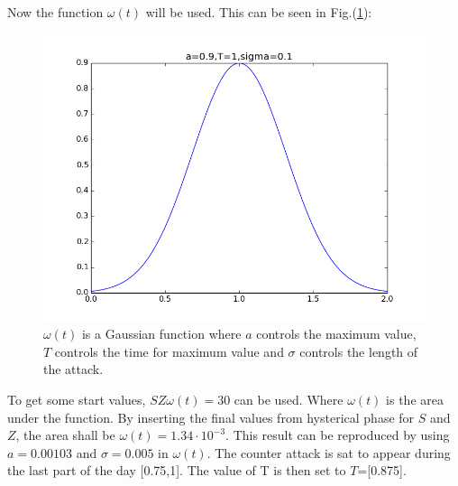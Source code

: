 \documentclass[%
twoside,                 %
final,                   %
chapterprefix=true,      %
open=right               %
10pt]{book}
\begin{document}
\vspace{3mm}




\vspace{3mm}


Now the function $\omega(t)$ will be used. This can be seen in Fig.(\ref{fig:omega_function}):


\begin{figure}[ht]
  \centerline{\includegraphics[width=0.9\linewidth]{1_fig/omega_function.png}}
  \caption{
  \label{fig:omega_function} $\omega (t)$ is a Gaussian function where $a$ controls the maximum value, $T$ controls the time for maximum value and $\sigma$ controls the length of the attack.
  }
\end{figure}


To get some start values, $SZ\omega(t)=30$ can be used. Where $\omega(t)$ is the area under the function. By inserting the final values from hysterical phase for $S$ and $Z$, the area shall be $\omega (t)=1.34\cdot10^{-3}$. This result can be reproduced by using $a= 0.00103$ and $\sigma = 0.005$ in $\omega(t)$. The counter attack is sat to appear during the last part of the day [0.75,1]. The value of T is then set to $T$=[0.875].
\end{document}
